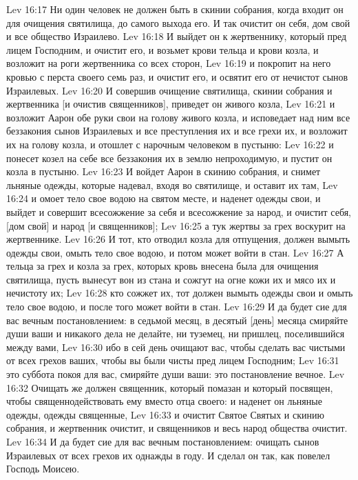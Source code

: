 \vs Lev 16:17 Ни один человек не должен быть в скинии собрания, когда входит он для очищения святилища, до самого выхода его. И так очистит он себя, дом свой и все общество Израилево.
\vs Lev 16:18 И выйдет он к жертвеннику, который пред лицем Господним, и очистит его, и возьмет крови тельца и крови козла, и возложит на роги жертвенника со всех сторон,
\vs Lev 16:19 и покропит на него кровью с перста своего семь раз, и очистит его, и освятит его от нечистот сынов Израилевых.
\vs Lev 16:20 И совершив очищение святилища, скинии собрания и жертвенника [и очистив священников], приведет он живого козла,
\vs Lev 16:21 и возложит Аарон обе руки свои на голову живого козла, и исповедает над ним все беззакония сынов Израилевых и все преступления их и все грехи их, и возложит их на голову козла, и отошлет с нарочным человеком в пустыню:
\vs Lev 16:22 и понесет козел на себе все беззакония их в землю непроходимую, и пустит он козла в пустыню.
\vs Lev 16:23 И войдет Аарон в скинию собрания, и снимет льняные одежды, которые надевал, входя во святилище, и оставит их там,
\vs Lev 16:24 и омоет тело свое водою на святом месте, и наденет одежды свои, и выйдет и совершит всесожжение за себя и всесожжение за народ, и очистит себя, [дом свой] и народ [и священников];
\vs Lev 16:25 а тук жертвы за грех воскурит на жертвеннике.
\vs Lev 16:26 И тот, кто отводил козла для отпущения, должен вымыть одежды свои, омыть тело свое водою, и потом может войти в стан.
\vs Lev 16:27 А тельца за грех и козла за грех, которых кровь внесена была для очищения святилища, пусть вынесут вон из стана и сожгут на огне кожи их и мясо их и нечистоту их;
\vs Lev 16:28 кто сожжет их, тот должен вымыть одежды свои и омыть тело свое водою, и после того может войти в стан.
\rsbpar\vs Lev 16:29 И да будет сие для вас вечным постановлением: в седьмой месяц, в десятый [день] месяца смиряйте души ваши и никакого дела не делайте, ни туземец, ни пришлец, поселившийся между вами,
\vs Lev 16:30 ибо в сей день очищают вас, чтобы сделать вас чистыми от всех грехов ваших, чтобы вы были чисты пред лицем Господним;
\vs Lev 16:31 это суббота покоя для вас, смиряйте души ваши: это постановление вечное.
\vs Lev 16:32 Очищать же должен священник, который помазан и который посвящен, чтобы священнодействовать ему вместо отца своего: и наденет он льняные одежды, одежды священные,
\vs Lev 16:33 и очистит Святое Святых и скинию собрания, и жертвенник очистит, и священников и весь народ общества очистит.
\vs Lev 16:34 И да будет сие для вас вечным постановлением: очищать сынов Израилевых от всех грехов их однажды в году. И сделал он так, как повелел Господь Моисею.

